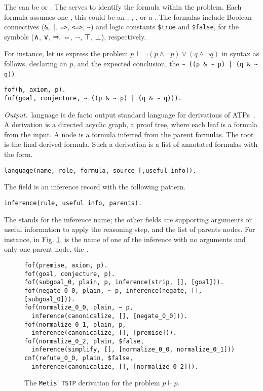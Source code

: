 \documentclass[../main.tex]{subfiles}
\begin{document}
The  can be  or . The 
serves to identify the formula within the problem. Each formula
assumes one , this could be an ,
, , or a .
The formulas include Boolean connectives (\verb!&!, \verb!|!,
\verb!=>!, \verb!<=>!, \verb!~!) and logic constants \verb!$true!
and \verb!$false!, for the symbols (∧, ∨, ⇒, ⇔, ¬, ⊤, ⊥), respectively.

For instance, let us express the problem
$p\, \vdash \neg (p \wedge \neg p) ∨ (q \wedge \neg q)$
in \TPTP syntax as follows, declaring an \tptpaxiom $p$, and the
expected conclusion, the  \tptpconjecture
\verb!~ ((p & ~ p) | (q & ~ q))!.

\begin{verbatim}
fof(h, axiom, p).
fof(goal, conjecture, ~ ((p & ~ p) | (q & ~ q))).
\end{verbatim}

\textit{Output.}~\TSTP language is de facto output standard language
for derivations of ATPs~\cite{Sutcliffe-Schulz-Claessen-VanGelder-2006}. A \TSTP derivation
is a directed acyclic graph, a proof tree, where each leaf is a
formula from the \TPTP input. A node is a formula inferred from the
parent formulas. The root is the final derived formula. Such a
derivation is a list of annotated formulas with the form.

\begin{verbatim}
language(name, role, formula, source [,useful info]).
\end{verbatim}

The  field is an inference record with the following
pattern.

\begin{verbatim}
inference(rule, useful info, parents).
\end{verbatim}

The  stands for the inference name; the other fields are
supporting arguments or useful information to apply the reasoning
step, and the list of parents nodes. For instance, in Fig.
\ref{fig:metis-proof-tstp}, \strip is the name of one of the
inference with no arguments and only one parent node, the
.

\begin{figure}
\begin{verbatim}
fof(premise, axiom, p).
fof(goal, conjecture, p).
fof(subgoal_0, plain, p, inference(strip, [], [goal])).
fof(negate_0_0, plain, ~ p, inference(negate, [], [subgoal_0])).
fof(normalize_0_0, plain, ∼ p,
  inference(canonicalize, [], [negate_0_0])).
fof(normalize_0_1, plain, p,
  inference(canonicalize, [], [premise])).
fof(normalize_0_2, plain, $false,
  inference(simplify, [], [normalize_0_0, normalize_0_1]))
cnf(refute_0_0, plain, $false,
  inference(canonicalize, [], [normalize_0_2])).
\end{verbatim}
\caption{The \texttt{Metis}' \texttt{TSTP} derivation for the
problem $p\vdash p$.}
\label{fig:metis-proof-tstp}
\end{figure}
\end{document}
